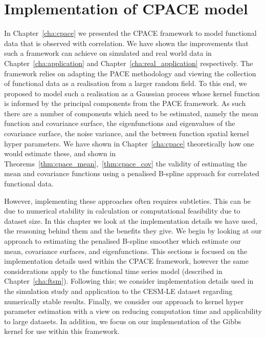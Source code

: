 
\chapter{Implementation of CPACE model \label{cha:implementation}}  %

\ifpdf
	\graphicspath{{Chapter8/Figs/Raster/}{Chapter8/Figs/PDF/}{Chapter8/Figs/}}
\else
	\graphicspath{{Chapter8/Figs/Vector/}{Chapter8/Figs/}}
\fi

In Chapter~\ref{cha:cpace} we presented the CPACE framework to model functional data that is observed with correlation.
We have shown the improvements that such a framework can achieve on simulated and real world data in Chapter~\ref{cha:application} and Chapter~\ref{cha:real_application} respectively.
The framework relies on adapting the PACE methodology and viewing the collection of functional data as a realisation from a larger random field.
To this end, we proposed to model such a realisation as a Gaussian process whose kernel function is informed by the principal components from the PACE framework.
As such there are a number of components which need to be estimated, namely the mean function and covariance surface, the eigenfunctions and eigenvalues of the covariance surface, the noise variance, and the between function spatial kernel hyper parameters.
We have shown in Chapter~\ref{cha:cpace} theoretically how one would estimate these, and shown in Theorems~\ref{thm:cpace_mean},~\ref{thm:cpace_cov} the validity of estimating the mean and covariance functions using a penalised B-spline approach for correlated functional data.

However, implementing these approaches often requires subtleties.
This can be due to numerical stability in calculation or computational feasibility due to dataset size.
In this chapter we look at the implementation details we have used, the reasoning behind them and the benefits they give.
We begin by looking at our approach to estimating the penalised B-spline smoother which estimate our mean, covariance surfaces, and eigenfunctions.
This sections is focused on the implementation details used within the CPACE framework, however the same considerations apply to the functional time series model (described in Chapter~\ref{cha:ftsm}).
Following this; we consider implementation details used in the simulation study and application to the CESM-LE dataset regarding numerically stable results.
Finally, we consider our approach to kernel hyper parameter estimation with a view on reducing computation time and applicability to large datasets.
In addition, we focus on our implementation of the Gibbs kernel for use within this framework.

